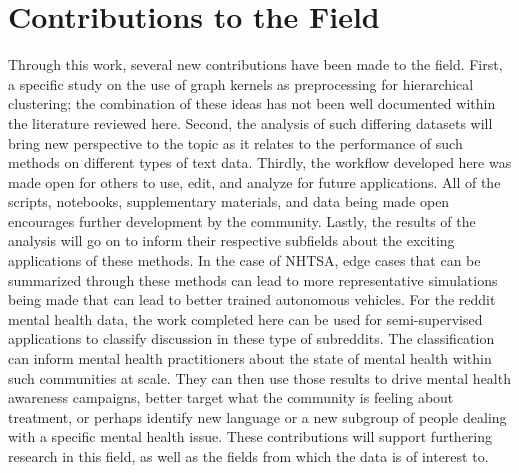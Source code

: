 \section{Contributions to the Field}

\hspace*{0.5cm} Through this work, several new contributions have been made to the field. First, a specific study on the use of graph kernels as preprocessing for hierarchical clustering; the combination of these ideas has not been well documented within the literature reviewed here. Second, the analysis of such differing datasets will bring new perspective to the topic as it relates to the performance of such methods on different types of text data. Thirdly, the workflow developed here was made open for others to use, edit, and analyze for future applications. All of the scripts, notebooks, supplementary materials, and data being made open encourages further development by the community. Lastly, the results of the analysis will go on to inform their respective subfields about the exciting applications of these methods. In the case of NHTSA, edge cases that can be summarized through these methods can lead to more representative simulations being made that can lead to better trained autonomous vehicles. For the reddit mental health data, the work completed here can be used for semi-supervised applications to classify discussion in these type of subreddits. The classification can inform mental health practitioners about the state of mental health within such communities at scale. They can then use those results to drive mental health awareness campaigns, better target what the community is feeling about treatment, or perhaps identify new language or a new subgroup of people dealing with a specific mental health issue. These contributions will support furthering research in this field, as well as the fields from which the data is of interest to. 

 

 


